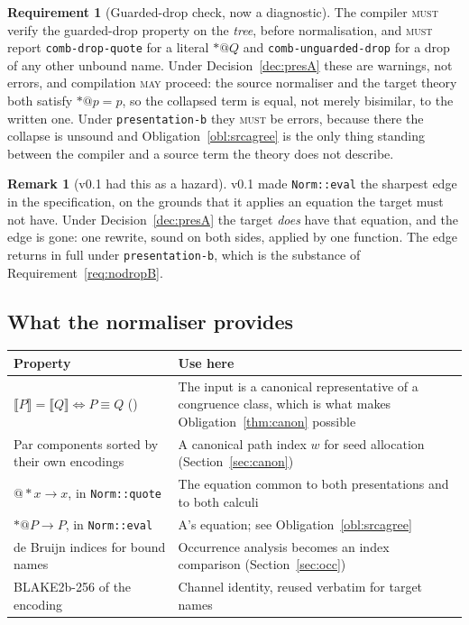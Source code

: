 \documentclass[11pt,a4paper]{article}
\makeatletter
\newcommand{\code}[1]{\texttt{#1}}
\newcommand{\MUST}{\textsc{must}}
\newcommand{\MAY}{\textsc{may}}
\newcommand{\quo}[1]{@#1}
\newcommand{\drp}[1]{{*}#1}
\newcommand{\enc}[1]{\llbracket #1 \rrbracket}
\newcommand{\scong}{\equiv}
\theoremstyle{definition}
\newtheorem{requirement}[definition]{Requirement}
\newtheorem{remark}[definition]{Remark}
\theoremstyle{plain}
\makeatother
\begin{document}
\begin{requirement}[Guarded-drop check, now a diagnostic]\label{req:guarded}
The compiler \MUST{} verify the guarded-drop property on the \emph{tree},
before normalisation, and \MUST{} report \code{comb-drop-quote} for a literal
$\drp{\quo{Q}}$ and \code{comb-unguarded-drop} for a drop of any other
unbound name. Under Decision~\ref{dec:presA} these are warnings, not errors,
and compilation \MAY{} proceed: the source normaliser and the target theory
both satisfy $\drp{\quo{p}} = p$, so the collapsed term is equal, not merely
bisimilar, to the written one. Under \code{presentation-b} they \MUST{} be
errors, because there the collapse is unsound and
Obligation~\ref{obl:srcagree} is the only thing standing between the compiler
and a source term the theory does not describe.
\end{requirement}

\begin{remark}[v0.1 had this as a hazard]
v0.1 made \code{Norm::eval} the sharpest edge in the specification, on the
grounds that it applies an equation the target must not have. Under
Decision~\ref{dec:presA} the target \emph{does} have that equation, and the
edge is gone: one rewrite, sound on both sides, applied by one function. The
edge returns in full under \code{presentation-b}, which is the substance of
Requirement~\ref{req:nodropB}.
\end{remark}

\subsection{What the normaliser provides}

\begin{center}
\begin{tabularx}{\linewidth}{@{}l>{\raggedright\arraybackslash}X@{}}
\toprule
Property & Use here\\
\midrule
$\enc{P} = \enc{Q} \iff P \scong Q$ (\cite[Prop.~6.9]{k1ndl1ng}) & The input
is a canonical representative of a congruence class, which is what makes
Obligation~\ref{thm:canon} possible\\
Par components sorted by their own encodings & A canonical path index $w$ for
seed allocation (Section~\ref{sec:canon})\\
$\quo{\drp{x}} \to x$, in \code{Norm::quote} & The equation common to both
presentations and to both calculi\\
$\drp{\quo{P}} \to P$, in \code{Norm::eval} & A's equation; see
Obligation~\ref{obl:srcagree}\\
de Bruijn indices for bound names & Occurrence analysis becomes an index
comparison (Section~\ref{sec:occ})\\
BLAKE2b-256 of the encoding & Channel identity, reused verbatim for target
names\\
\bottomrule
\end{tabularx}
\end{center}
\end{document}
